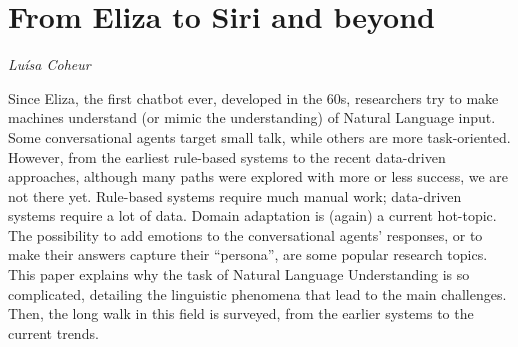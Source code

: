 \documentclass[../booklet.tex]{subfiles}
\begin{document}
\section[From Eliza to Siri and beyond. {\it Luísa Coheur}]{From Eliza to Siri and beyond}

\begin{center}
  {\it Luísa Coheur}
\end{center}

\vskip 0.8cm


Since Eliza, the first chatbot ever, developed in the 60s, researchers try to make machines understand (or mimic the understanding) of Natural Language input. Some conversational agents target small talk, while others are more task-oriented. However, from the earliest rule-based systems to the recent data-driven approaches, although many paths were explored with more or less success, we are not there yet. Rule-based systems require much manual work; data-driven systems require a lot of data. Domain adaptation is (again) a current hot-topic. The possibility to add emotions to the conversational agents' responses, or to make their answers capture their ``persona'', are some popular research topics. 
This paper explains why the task of Natural Language Understanding is so complicated, detailing the linguistic phenomena that lead to the main challenges. Then, the long walk in this field is surveyed, from the earlier systems to the current trends.
\end{document}
